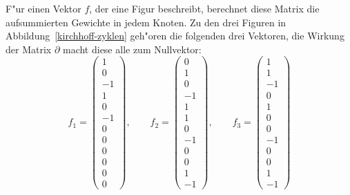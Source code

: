 F"ur einen Vektor $f$, der eine Figur beschreibt, berechnet diese
Matrix die aufsummierten Gewichte in jedem Knoten.
Zu den drei Figuren in Abbildung~\ref{kirchhoff-zyklen} geh"oren
die folgenden drei Vektoren, die Wirkung der Matrix $\partial$
macht diese alle zum Nullvektor:
\[
f_1=\begin{pmatrix}
1\\0\\-1\\1\\0\\-1\\0\\0\\0\\0\\0\\0
\end{pmatrix},
\qquad
f_2=\begin{pmatrix}
0\\1\\0\\-1\\1\\1\\0\\-1\\0\\0\\1\\-1
\end{pmatrix},
\qquad
f_3=\begin{pmatrix}
1\\1\\-1\\0\\1\\0\\0\\-1\\0\\0\\1\\-1
\end{pmatrix}
\]
